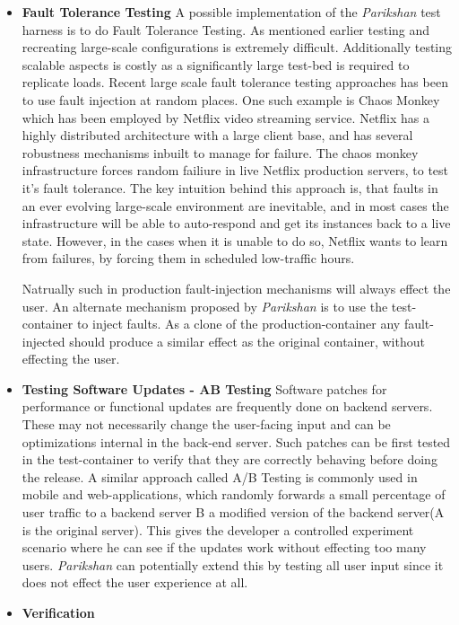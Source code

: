 \begin{itemize}
  \item \textbf{Fault Tolerance Testing}
    A possible implementation of the \emph{Parikshan} test harness is to do Fault Tolerance Testing.
As mentioned earlier testing and recreating large-scale configurations is extremely difficult.
Additionally testing scalable aspects is costly as a significantly large test-bed is required to replicate loads. 
Recent large scale fault tolerance testing approaches has been to use fault injection at random places.
One such example is Chaos Monkey\cite{chaosmonkey} which has been employed by Netflix \cite{netflix} video streaming service. 
Netflix has a highly distributed architecture with a large client base, and has several robustness mechanisms inbuilt to manage for failure. 
The chaos monkey infrastructure forces random failiure in live Netflix production servers, to test it's fault tolerance.
The key intuition behind this approach is, that faults in an ever evolving large-scale environment are inevitable, and in most cases the infrastructure will be able to auto-respond and get its instances back to a live state. 
However, in the cases when it is unable to do so, Netflix wants to learn from failures, by forcing them in scheduled low-traffic hours.

Natrually such in production fault-injection mechanisms will always effect the user. 
An alternate mechanism proposed by \emph{Parikshan} is to use the test-container to inject faults. 
As a clone of the production-container any fault-injected should produce a similar effect as the original container, without effecting the user.

  \item \textbf{Testing Software Updates - AB Testing}
Software patches for performance or functional updates are frequently done on backend servers. 
These may not necessarily change the user-facing input and can be optimizations internal in the back-end server.
Such patches can be first tested in the test-container to verify that they are correctly behaving before doing the release.
A similar approach called A/B Testing\cite{abtesting} is commonly used in mobile and web-applications, which randomly forwards a small percentage of user traffic to a backend server B  a modified version of the backend server(A is the original server). 
This gives the developer a controlled experiment scenario where he can see if the updates work without effecting too many users.
\textit{Parikshan} can potentially extend this by testing all user input since it does not effect the user experience at all.

  \item \textbf{Verification}

\end{itemize}

